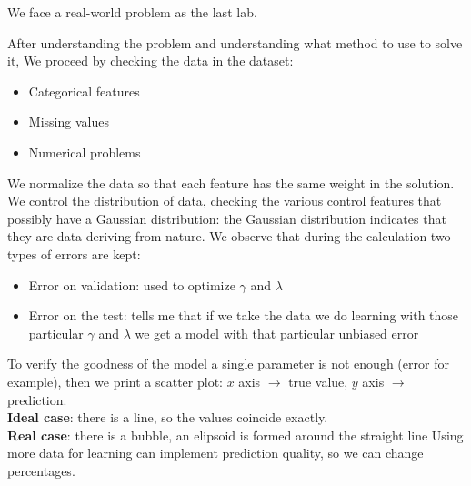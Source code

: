 We face a real-world problem as the last lab.

After understanding the problem and understanding what method to use to solve it, We proceed by checking the data in the dataset:
\begin{itemize}
	
	\item Categorical features
	\item Missing values
	\item Numerical problems
	
\end{itemize}
We normalize the data so that each feature has the same weight in the solution.
We control the distribution of data, checking the various control features that possibly have a Gaussian distribution: the Gaussian distribution indicates that they are data deriving from nature.
We observe that during the calculation two types of errors are kept:
\begin{itemize}
	
	\item Error on validation: used to optimize $\gamma$ and $\lambda$
	\item Error on the test: tells me that if we take the data we do learning with those particular $\gamma$ and $\lambda$ we get a model with that particular unbiased error

	
\end{itemize}
To verify the goodness of the model a single parameter is not enough (error for example), then we print a scatter plot: $x$ axis $\rightarrow$ true value, $y$ axis $\rightarrow$ prediction.\\
\textbf{Ideal case}: there is a line, so the values coincide exactly.\\
\textbf{Real case}: there is a bubble, an elipsoid is formed around the straight line
Using more data for learning can implement prediction quality, so we can change percentages.

